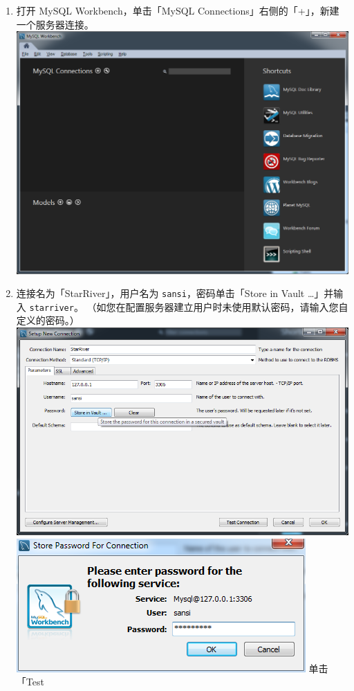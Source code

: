 \begin{enumerate}
\def\labelenumi{\arabic{enumi}.}
\itemsep1pt\parskip0pt
\item
  打开 MySQL Workbench，单击「MySQL
  Connections」右侧的「+」，新建一个服务器连接。
  \includegraphics{img/db_init_1.png}
\item
  连接名为「StarRiver」，用户名为 \texttt{sansi}，密码单击「Store in
  Vault \ldots{}」并输入 \texttt{starriver}。
  （如您在配置服务器建立用户时未使用默认密码，请输入您自定义的密码。）
  \includegraphics{img/db_init_2.png}
  \includegraphics{img/db_init_3.png} 单击「Test

\end{enumerate}
